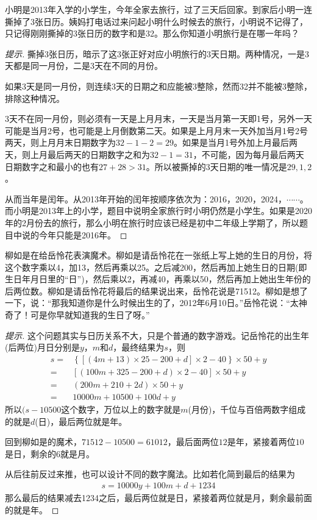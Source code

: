 \begin{example}
  小明是2013年入学的小学生，今年全家去旅行，过了三天后回家。到家后小明一连撕掉了3张日历。姨妈打电话过来问起小明什么时候去的旅行，小明说不记得了，只记得刚刚撕掉的3张日历的数字和是32。那么你知道小明旅行是在哪一年吗？
\end{example}
\begin{proof}[提示]
  撕掉3张日历，暗示了这3张正好对应小明旅行的3天日期。两种情况，一是3天都是同一月份，二是3天在不同的月份。

  如果3天是同一月份，则连续3天的日期之和应能被3整除，然而32并不能被3整除，排除这种情况。

  3天不在同一月份，则必须有一天是上月月末，一天是当月第一天即1号，另外一天可能是当月2号，也可能是上月倒数第二天。如果是上月月末一天外加当月1号2号两天，则上月月末日期数字为$32-1-2=29$。如果是当月1号外加上月最后两天，则上月最后两天的日期数字之和为$32-1=31$，不可能，因为每月最后两天日期数字之和最小的也有$27+28>31$。所以被撕掉的3天日期的唯一情况是$29,1,2$。

  从而当年是闰年。从2013年开始的闰年按顺序依次为：2016，2020，2024，$\cdots\cdots$。而小明是2013年上的小学，题目中说明全家旅行时小明仍然是小学生。如果是2020年的2月份去的旅行，那么小明在旅行时应该已经是初中二年级上学期了，所以题目中说的今年只能是2016年。
\end{proof}

\begin{example}
  柳如是在给岳怜花表演魔术。柳如是请岳怜花在一张纸上写上她的生日的月份，将这个数字乘以4，加13，然后再乘以25。之后减200，然后再加上她生日的日期(即生日年月日里的“日”)，然后乘以2，再减40，再乘以50，然后再加上她出生年份的后两位数。柳如是请岳怜花将最后的结果说出来，岳怜花说是71512。柳如是想了一下，说：“那我知道你是什么时候出生的了，2012年6月10日。”岳怜花说：“太神奇了！可是你早就知道我的生日了呀。”
\end{example}
\begin{proof}[提示]
  这个问题其实与日历关系不大，只是个普通的数字游戏。记岳怜花的出生年(后两位)月日分别是$y$，$m$和$d$，最终结果为$s$，则
  \begin{align*}
    s ={}& \left\{ \left[ (4m + 13)\times 25 - 200 + d \right]\times 2 - 40 \right\} \times 50 + y \\
      ={}&       \left[ (100m + 325 - 200 + d) \times 2 - 40 \right] \times 50 + y\\
      ={}& (200m + 210 + 2d) \times 50 + y\\
      ={}& 10000m + 10500 + 100d + y
  \end{align*}
  所以$(s - 10500$这个数字，万位以上的数字就是$m$(月份)，千位与百倍两数字组成的就是$d$(日)，最后两位就是年。

  回到柳如是的魔术，$71512 - 10500 = 61012$，最后面两位$12$是年，紧接着两位$10$是日，剩余的$6$就是月。

  从后往前反过来推，也可以设计不同的数字魔法。比如若化简到最后的结果为
  \begin{align*}
    s = 10000y + 100m + d + 1234
  \end{align*}
  那么最后的结果减去1234之后，最后两位就是日，紧接着两位就是月，剩余最前面的就是年。
\end{proof}



